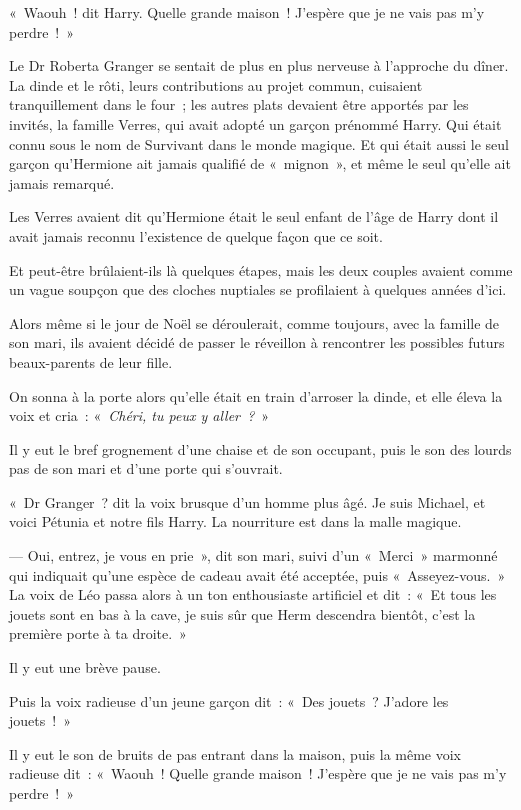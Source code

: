 «~Waouh~! dit Harry.
Quelle grande maison~!
J'espère que je ne vais pas m'y perdre~!~»

\later

Le Dr Roberta Granger se sentait de plus en plus nerveuse à l'approche du dîner.
La dinde et le rôti, leurs contributions au projet commun, cuisaient tranquillement dans le four~; les autres plats devaient être apportés par les invités, la famille Verres, qui avait adopté un garçon prénommé Harry.
Qui était connu sous le nom de Survivant dans le monde magique.
Et qui était aussi le seul garçon qu'Hermione ait jamais qualifié de «~mignon~», et même le seul qu'elle ait jamais remarqué.

Les Verres avaient dit qu'Hermione était le seul enfant de l'âge de Harry dont il avait jamais reconnu l'existence de quelque façon que ce soit.

Et peut-être brûlaient-ils là quelques étapes, mais les deux couples avaient comme un vague soupçon que des cloches nuptiales se profilaient à quelques années d'ici.

Alors même si le jour de Noël se déroulerait, comme toujours, avec la famille de son mari, ils avaient décidé de passer le réveillon à rencontrer les possibles futurs beaux-parents de leur fille.

On sonna à la porte alors qu'elle était en train d'arroser la dinde, et elle éleva la voix et cria~: «~\emph{Chéri, tu peux y aller~?}~»

Il y eut le bref grognement d'une chaise et de son occupant, puis le son des lourds pas de son mari et d'une porte qui s'ouvrait.

«~Dr Granger~? dit la voix brusque d'un homme plus âgé.
Je suis Michael, et voici Pétunia et notre fils Harry.
La nourriture est dans la malle magique.

--- Oui, entrez, je vous en prie~», dit son mari, suivi d'un «~Merci~» marmonné qui indiquait qu'une espèce de cadeau avait été acceptée, puis «~Asseyez-vous.~»
La voix de Léo passa alors à un ton enthousiaste artificiel et dit~: «~Et tous les jouets sont en bas à la cave, je suis sûr que Herm descendra bientôt, c'est la première porte à ta droite.~»

Il y eut une brève pause.

Puis la voix radieuse d'un jeune garçon dit~: «~Des jouets~?
J'adore les jouets~!~»

Il y eut le son de bruits de pas entrant dans la maison, puis la même voix radieuse dit~: «~Waouh~!
Quelle grande maison~!
J'espère que je ne vais pas m'y perdre~!~»

